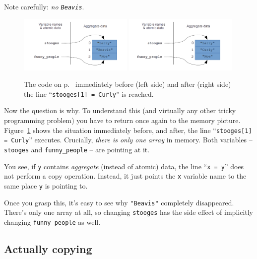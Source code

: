 Note carefully: \textit{no \texttt{Beavis}}.

\begin{figure}[ht]
\centering
\includegraphics[width=0.49\textwidth]{refNotCopy.png}
\includegraphics[width=0.49\textwidth]{refNotCopy2.png}
\caption{The code on p.~\pageref{code:refNotCopy} immediately before (left
side) and after (right side) the line ``\texttt{stooges[1] = \textquotesingle
Curly\textquotesingle}'' is reached.}
\label{fig:refNotCopy}
\end{figure}


Now the question is why. To understand this (and virtually any other tricky
programming problem) you have to return once again to the memory picture.
Figure~\ref{fig:refNotCopy} shows the situation immediately before, and after,
the line ``\texttt{stooges[1] = \textquotesingle Curly\textquotesingle}''
executes. Crucially, \textit{there is only one array} in memory. Both variables
-- \texttt{stooges} and \texttt{funny\_people} -- are pointing at it.

You see, if \texttt{y} contains \textit{aggregate} (instead of atomic) data,
the line ``\texttt{x = y}'' does not perform a copy operation. Instead, it just
points the \texttt{x} variable name to the same place \texttt{y} is pointing
to.

Once you grasp this, it's easy to see why \texttt{"Beavis"} completely
disappeared. There's only one array at all, so changing \texttt{stooges} has
the side effect of implicitly changing \texttt{funny\_people} as well.

\subsection{Actually copying}

